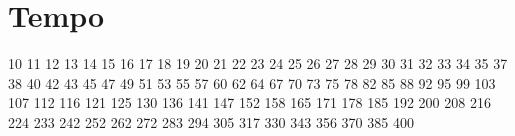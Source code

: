 \section{Tempo}
10  
11  
12  
13  
14  
15  
16  
17  
18  
19 
20 
21 
22 
23 
24 
25 
26 
27 
28 
29 
30 
31 
32 
33 
34 
35 
37 
38 
40 
42 
43 
45 
47 
49 
51 
53 
55 
57 
60 
62 
64 
67 
70 
73 
75 
78 
82 
85 
88 
92 
95 
99 
103
107
112
116
121
125
130
136
141
147
152
158
165
171
178
185
192
200
208
216
224
233
242
252
262
272
283
294
305
317
330
343
356
370
385
400
